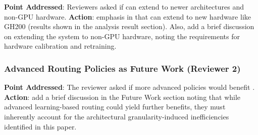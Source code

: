 \textbf{Point Addressed}: Reviewers asked if \name can extend to newer architectures and non-GPU hardware.
\textbf{Action}: emphasis in  that \name can extend to new hardware like GH200 (results shown in the analysis result section). Also, add a brief discussion on extending the system to non-GPU hardware, noting the requirements for hardware calibration and \governor retraining. 

\subsubsection{Advanced Routing Policies as Future Work (Reviewer 2)}

\textbf{Point Addressed}: The reviewer asked if more advanced policies would benefit \router.
\textbf{Action}: add a brief discussion in the Future Work section noting that while advanced learning-based routing could yield further benefits, they must inherently account for the architectural granularity-induced inefficiencies identified in this paper. 
